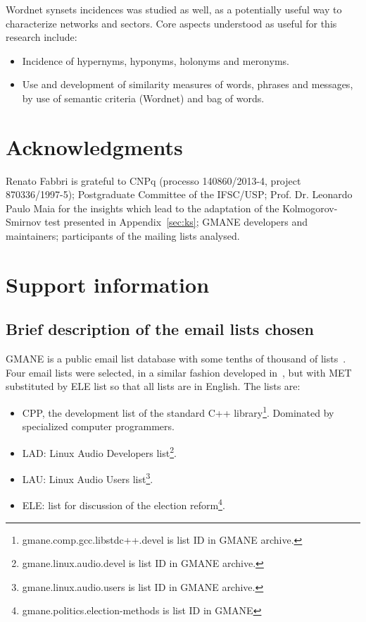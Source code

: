 \documentclass[%
 aip,
 jmp,%
 amsmath,amssymb,
 reprint,%
]{revtex4-1}
\begin{document}
Wordnet synsets incidences was studied as well, as a potentially useful way to characterize networks and sectors. Core aspects understood as useful for this research include:
\begin{itemize}
    \item Incidence of hypernyms, hyponyms, holonyms and meronyms.
    \item Use and development of similarity measures of words, phrases and messages, by use of semantic criteria (Wordnet) and bag of words.
\end{itemize}



\section{Acknowledgments}
Renato Fabbri is grateful to CNPq 
(processo 140860/2013-4, project 870336/1997-5);
Postgraduate Committee of the IFSC/USP;
Prof. Dr. Leonardo Paulo Maia for the insights
which lead to the adaptation of the Kolmogorov-Smirnov
test presented in Appendix~\ref{sec:ks}; GMANE
developers and maintainers; participants of the
mailing lists analysed.

%

%
%
\newpage
\appendix
\section{Support information}\label{sec:si}
\subsection{Brief description of the email lists chosen}\label{subsec:gm}
GMANE is a public email list database with some tenths of thousand of lists~\cite{GMANE}. Four email lists were selected, in a similar fashion developed in~\cite{evoSN}, but with MET substituted by ELE list so that all lists are in English. The lists are:
\begin{itemize}
    \item CPP, the development list of the standard C++ library\footnote{gmane.comp.gcc.libstdc++.devel is list ID in GMANE archive.}. Dominated by specialized computer programmers.
    \item LAD: Linux Audio Developers list\footnote{gmane.linux.audio.devel is list ID in GMANE archive.}.
    \item LAU: Linux Audio Users list\footnote{gmane.linux.audio.users is list ID in GMANE archive.}.
    \item ELE: list for discussion of the election reform\footnote{gmane.politics.election-methods is list ID in GMANE}.
\end{itemize}
\end{document}
